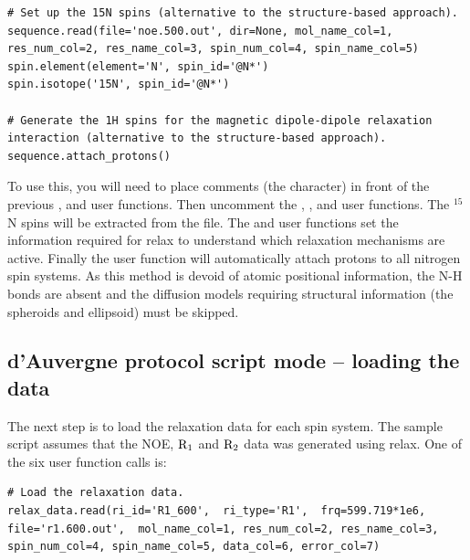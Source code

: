 \begin{htmlonly}
\begin{htmlonly}
\begin{lstlisting}[firstnumber=172]
# Set up the 15N spins (alternative to the structure-based approach).
sequence.read(file='noe.500.out', dir=None, mol_name_col=1, res_num_col=2, res_name_col=3, spin_num_col=4, spin_name_col=5)
spin.element(element='N', spin_id='@N*')
spin.isotope('15N', spin_id='@N*')

# Generate the 1H spins for the magnetic dipole-dipole relaxation interaction (alternative to the structure-based approach).
sequence.attach_protons()
\end{lstlisting}

To use this, you will need to place comments (the \pycode{\#} character) in front of the previous ,  and  user functions.  Then uncomment the , ,  and  user functions.  The $^{15}$N spins will be extracted from the  file.  The  and  user functions set the information required for relax to understand which relaxation mechanisms are active.  Finally the  user function will automatically attach protons to all nitrogen spin systems.  As this method is devoid of atomic positional information, the N-H bonds are absent and the diffusion models requiring structural information (the spheroids and ellipsoid) must be skipped.



\subsection{d'Auvergne protocol script mode -- loading the data}

The next step is to load the relaxation data for each spin system.  The sample script assumes that the NOE, $\mathrm{R}_1$ and $\mathrm{R}_2$ data was generated using relax.  One of the six user function calls is:

\begin{lstlisting}[firstnumber=180]
# Load the relaxation data.
relax_data.read(ri_id='R1_600',  ri_type='R1',  frq=599.719*1e6, file='r1.600.out',  mol_name_col=1, res_num_col=2, res_name_col=3, spin_num_col=4, spin_name_col=5, data_col=6, error_col=7)
\end{lstlisting}


\end{htmlonly}
\end{htmlonly}
